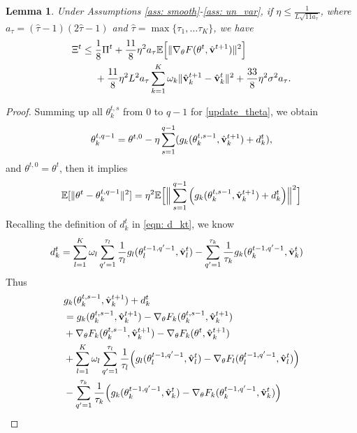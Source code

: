 \documentclass[twoside,journal]{IEEEtran}
\def\VectorFont{\bf}
\newcommand{\vv}{{\VectorFont v}}
\newtheorem{lemma}{Lemma}
\begin{document}
\begin{lemma}\label{lem: xx1} Under Assumptions \ref{ass: smooth}-\ref{ass: un_var}, if
 $\eta\leq \frac{1}{L\sqrt{11a_{\tau}}}$, where $a_{\tau}=(\hat{\tau}-1)(2\hat{\tau}-1)$ and $\hat{\tau}=\max\{\tau_1,\ldots\tau_K\}$, we have
\begin{align}\label{eqn: theta_final}
\nonumber\Xi^t &\leq \frac{1}{8}\Pi^{t}+\frac{11}{8}\eta^2a_{\tau}\mathbb{E}\Big[\|
\nabla_{\theta}F(\theta^{t},\hat{\vv}^{t+1})
\|^2\Big]\\
&~~~~+\frac{11}{8}\eta^2L^2a_{\tau}\sum_{k=1}^K\omega_k\|\hat{\vv}_k^{t+1}-
\hat \vv_k^{t}\|^2+\frac{33}{8}\eta^2\sigma^2a_{\tau}.
\end{align}
\end{lemma}
\begin{proof}
Summing up all $\theta_k^{t,s}$ from $0$ to $q-1$ for \eqref{update_theta}, we obtain
$$
\theta_k^{t,q-1}=\theta^{t,0}-\eta\sum_{s=1}^{q-1}(
g_k(\theta_k^{t,s-1},\hat{\vv}_k^{t+1})
+d_k^t),
$$
and $\theta^{t,0}=\theta^t$, then it implies
\begin{align}\label{E_theta}
\mathbb{E}[\|\theta^t-\theta_k^{t,q-1}\|^2]
=\eta^2
\mathbb{E}\Big[\Big\|\sum_{s=1}^{q-1}\Big(g_k(\theta_k^{t,s-1},\hat{\vv}_k^{t+1})
+d_k^t\Big)\Big\|^2\Big]
\end{align}
Recalling  the definition of $d_k^t$ in \eqref{eqn: d_kt}, we know
\begin{align}
\nonumber
d_k^t&=
\sum_{l=1}^K\omega_l\sum_{q^\prime=1}^{\tau_l}\frac{1}{\tau_l}
g_l(\theta_l^{t-1,q^\prime-1}, \hat \vv_l^{t})-\sum_{q^\prime=1}^{\tau_k}\frac{1}{\tau_k}
g_k(\theta_k^{t-1,q^\prime-1}, \hat \vv_k^{t})
\end{align}
Thus
\begin{align}\label{ggg_k}
\nonumber&g_k(\theta_k^{t,s-1},\hat{\vv}_k^{t+1})
+d_k^t\\
\nonumber&=g_k(\theta_k^{t,s-1},\hat{\vv}_k^{t+1})-\nabla_{\theta} F_k(\theta_k^{t,s-1},\hat{\vv}_k^{t+1})\\
\nonumber&+\nabla_{\theta} F_k(\theta_k^{t,s-1},\hat{\vv}_k^{t+1})
-\nabla_{\theta}F_k(\theta^{t},\hat{\vv}_k^{t+1})\\
\nonumber&+ \sum_{l=1}^K\omega_l\sum_{q^\prime=1}^{\tau_l}\frac{1}{\tau_l}
\Big(g_l(\theta_l^{t-1,q^\prime-1}, \hat \vv_l^{t})-
\nabla_{\theta} F_l(\theta_l^{t-1,q^\prime-1}, \hat \vv_l^{t})\Big)\\
\nonumber&-\sum_{q^\prime=1}^{\tau_k}\frac{1}{\tau_k}
\Big(g_k(\theta_k^{t-1,q^\prime-1}, \hat \vv_k^{t})-
\nabla_{\theta} F_k(\theta_k^{t-1,q^\prime-1}, \hat \vv_k^{t})\Big)\\

\end{align}
\end{proof}
\end{document}
